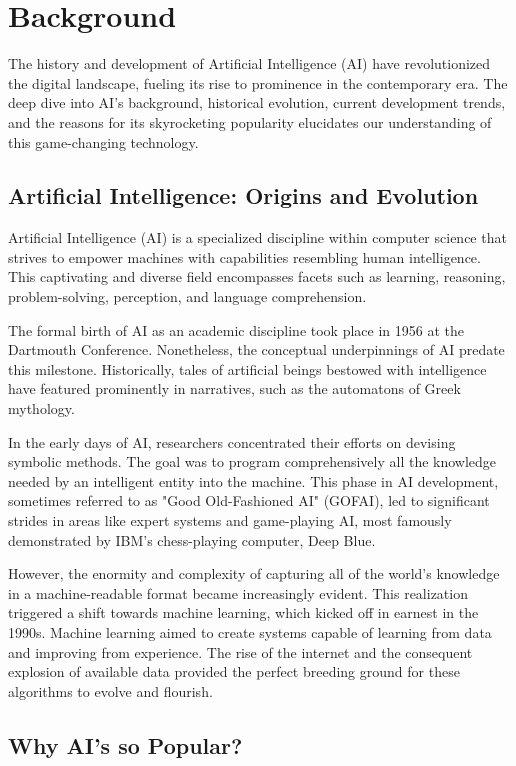 \documentclass[12pt]{article}
\numberwithin{figure}{section}
\begin{document}
\tableofcontents
\clearpage
\section{Background}
The history and development of Artificial Intelligence (AI) have revolutionized the digital landscape, fueling its rise to prominence in the contemporary era. The deep dive into AI's background, historical evolution, current development trends, and the reasons for its skyrocketing popularity elucidates our understanding of this game-changing technology.

\subsection{Artificial Intelligence: Origins and Evolution}
Artificial Intelligence (AI) is a specialized discipline within computer science that strives to empower machines with capabilities resembling human intelligence. This captivating and diverse field encompasses facets such as learning, reasoning, problem-solving, perception, and language comprehension.

The formal birth of AI as an academic discipline took place in 1956 at the Dartmouth Conference. Nonetheless, the conceptual underpinnings of AI predate this milestone. Historically, tales of artificial beings bestowed with intelligence have featured prominently in narratives, such as the automatons of Greek mythology.

In the early days of AI, researchers concentrated their efforts on devising symbolic methods. The goal was to program comprehensively all the knowledge needed by an intelligent entity into the machine. This phase in AI development, sometimes referred to as "Good Old-Fashioned AI" (GOFAI), led to significant strides in areas like expert systems and game-playing AI, most famously demonstrated by IBM's chess-playing computer, Deep Blue.

However, the enormity and complexity of capturing all of the world's knowledge in a machine-readable format became increasingly evident. This realization triggered a shift towards machine learning, which kicked off in earnest in the 1990s. Machine learning aimed to create systems capable of learning from data and improving from experience. The rise of the internet and the consequent explosion of available data provided the perfect breeding ground for these algorithms to evolve and flourish.

\subsection{Why AI's so Popular?}
\end{document}
